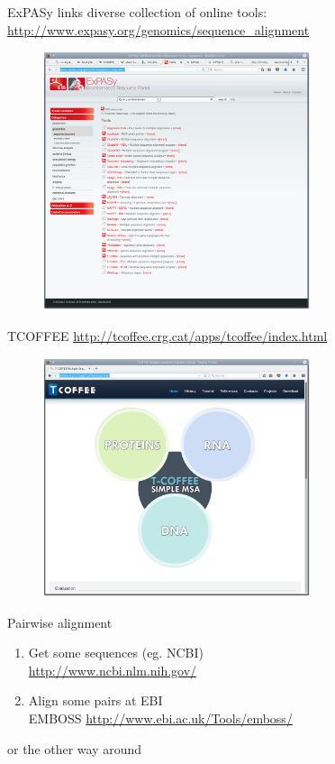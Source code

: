 \documentclass[pdf]{beamer}
\begin{document}
\begin{frame}{ExPASy links}
  diverse collection of online tools:
  \url{http://www.expasy.org/genomics/sequence_alignment}
  \begin{figure}[ht]
    \includegraphics[width=0.7\textwidth]{images/expasy_tools}
  \end{figure}
\end{frame}

\begin{frame}{TCOFFEE}
  \url{http://tcoffee.crg.cat/apps/tcoffee/index.html}
  \begin{figure}[ht]
    \includegraphics[width=0.7\textwidth]{images/tcoffee}
  \end{figure}
\end{frame}

\begin{frame}{Pairwise alignment}
  \begin{enumerate}
  \item Get some sequences (eg. NCBI)\\
    \url{http://www.ncbi.nlm.nih.gov/}
  \item Align some pairs at EBI\\
    EMBOSS \url{http://www.ebi.ac.uk/Tools/emboss/}
  \end{enumerate}

  or the other way around
\end{frame}
\end{document}
